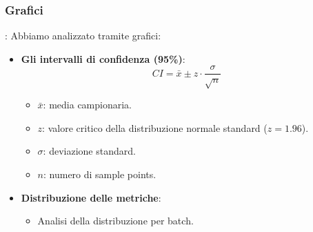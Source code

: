 \subsubsection{Grafici}
\begin{frame}{\subsecname: \subsubsecname}
Abbiamo analizzato tramite grafici:
    \begin{itemize}
        \item \textbf{Gli intervalli di confidenza (95\%)}:
        \[
        CI = \bar{x} \pm z \cdot \frac{\sigma}{\sqrt{n}}
        \]
        \begin{itemize}
            \item $\bar{x}$: media campionaria.
            \item $z$: valore critico della distribuzione normale standard ($z = 1.96$).
            \item $\sigma$: deviazione standard.
            \item $n$: numero di sample points.
        \end{itemize}
        \item \textbf{Distribuzione delle metriche}:
        \begin{itemize}
            \item Analisi della distribuzione per batch.
        \end{itemize}
    \end{itemize}
\end{frame}
